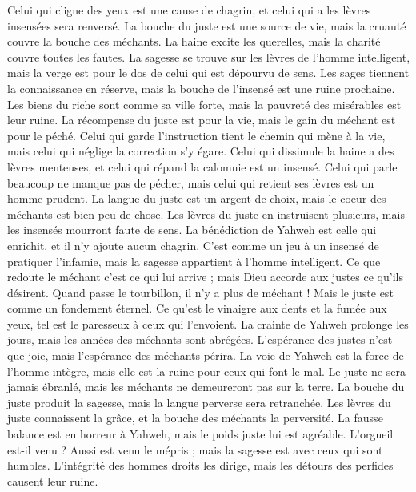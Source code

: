 \begin{multicols}{2}
Celui qui cligne des yeux est une cause de chagrin, et celui qui a les lèvres insensées sera renversé.
La bouche du juste est une source de vie, mais la cruauté couvre la bouche des méchants.
La haine excite les querelles, mais la charité couvre toutes les fautes.
La sagesse se trouve sur les lèvres de l'homme intelligent, mais la verge est pour le dos de celui qui est dépourvu de sens.
Les sages tiennent la connaissance en réserve, mais la bouche de l’insensé est une ruine prochaine.
Les biens du riche sont comme sa ville forte, mais la pauvreté des misérables est leur ruine.
La récompense du juste est pour la vie, mais le gain du méchant est pour le péché.
Celui qui garde l'instruction tient le chemin qui mène à la vie, mais celui qui néglige la correction s’y égare.
Celui qui dissimule la haine a des lèvres menteuses, et celui qui répand la calomnie est un insensé.
Celui qui parle beaucoup ne manque pas de pécher, mais celui qui retient ses lèvres est un homme prudent.
La langue du juste est un argent de choix, mais le coeur des méchants est bien peu de chose.
Les lèvres du juste en instruisent plusieurs, mais les insensés mourront faute de sens.
La bénédiction de Yahweh est celle qui enrichit, et il n'y ajoute aucun chagrin.
C'est comme un jeu à un insensé de pratiquer l’infamie, mais la sagesse appartient à l'homme intelligent.
Ce que redoute  le méchant c’est ce qui lui arrive ; mais Dieu accorde aux justes ce qu'ils désirent.
Quand passe le tourbillon, il n’y a plus de méchant ! Mais le juste est comme un fondement éternel.
Ce qu'est le vinaigre aux dents et la fumée aux yeux, tel est le paresseux à ceux qui l'envoient.
La crainte de Yahweh prolonge les jours, mais les années des méchants sont abrégées.
L'espérance des justes n'est que joie, mais l’espérance des méchants périra.
La voie de Yahweh est la force de l'homme intègre, mais elle est la ruine pour ceux qui font le mal.
Le juste ne sera jamais ébranlé, mais les méchants ne demeureront pas sur la terre.
La bouche du juste produit la sagesse, mais la langue perverse sera retranchée.
Les lèvres du juste connaissent la grâce, et la bouche des méchants la perversité.
\VerseOne{}La fausse balance est en horreur à Yahweh, mais le poids juste lui est agréable.
L'orgueil est-il venu ? Aussi est venu le mépris ; mais la sagesse est avec ceux qui sont humbles.
L'intégrité des hommes droits les dirige, mais les détours des perfides causent leur ruine.

\end{multicols}
